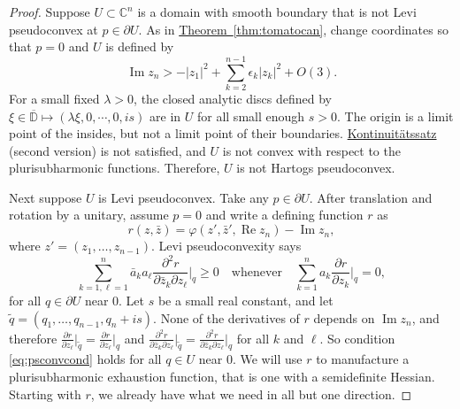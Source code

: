 \documentclass[12pt,openany]{book}
\renewcommand{\Re}{\operatorname{Re}}
\renewcommand{\Im}{\operatorname{Im}}
\newcommand{\sabs}[1]{\lvert {#1} \rvert}
\newcommand{\C}{{\mathbb{C}}}
\newcommand{\D}{{\mathbb{D}}}
\theoremstyle{plain}
\theoremstyle{remark}
\theoremstyle{definition}
\theoremstyle{exercise}
\theoremstyle{example}
\newcommand{\thmref}[1]{\hyperref[#1]{Theorem~\ref*{#1}}}
\begin{document}
\begin{proof}
Suppose
$U \subset \C^n$ is a domain with smooth boundary that is not
Levi pseudoconvex at $p \in \partial U$.
As in
\thmref{thm:tomatocan}, change coordinates so that $p=0$ and $U$ is defined
by
\begin{equation*}
\Im z_n > - \sabs{z_1}^2 + \sum_{k=2}^{n-1} \epsilon_k \sabs{z_k}^2 + O(3) .
\end{equation*}
For a small fixed $\lambda > 0$, the
closed analytic discs defined by $\xi \in \overline{\D} \mapsto (\lambda \xi, 0, \cdots, 0, is)$
are in $U$ for all small enough $s > 0$.  The origin
is a limit point of the insides, but not a limit point of their boundaries.
\hyperref[thm:contprinciple2]{Kontinuit\"atssatz} (second version) is not satisfied,
and $U$ is not
convex with respect to the plurisubharmonic functions.  Therefore,
$U$ is not Hartogs pseudoconvex.

Next suppose $U$ is Levi pseudoconvex.  Take any $p \in \partial U$.
After translation and rotation by a unitary, assume $p=0$ and
write a defining function $r$ as
\begin{equation*}
r(z,\bar{z}) = \varphi(z',\bar{z}',\Re z_n) - \Im z_n ,
\end{equation*}
where $z' = (z_1,\ldots,z_{n-1})$.
Levi pseudoconvexity says
\begin{equation} \label{eq:psconvcond}
\sum_{k=1,\ell=1}^n
\bar{a}_k a_\ell \frac{\partial^2 r}{\partial \bar{z}_k \partial z_\ell} \Big|_q \geq 0
\quad \text{whenever} \quad
\sum_{k=1}^n
a_k \frac{\partial r}{\partial z_k} \Big|_q = 0 ,
\end{equation}
for all $q \in \partial U$ near $0$.
Let $s$ be a small real constant,
and let $\widetilde{q} = (q_1,\ldots,q_{n-1},q_n + is)$.
None of the derivatives of $r$ depends on $\Im z_n$, and therefore
$\frac{\partial r}{\partial z_\ell} \big|_{\widetilde{q}} =
\frac{\partial r}{\partial z_\ell} \big|_{q}$ and
$\frac{\partial^2 r}{\partial \bar{z}_k \partial z_\ell} \big|_{\widetilde{q}} =
\frac{\partial^2 r}{\partial \bar{z}_k \partial z_\ell} \big|_{q}$
for all $k$ and $\ell$.
So condition \eqref{eq:psconvcond} holds for all $q \in U$ near $0$.
We will use $r$ to manufacture a plurisubharmonic exhaustion function, that
is one with a semidefinite Hessian.  Starting with $r$, we already
have what we need in all but one direction.


\end{proof}
\end{document}

